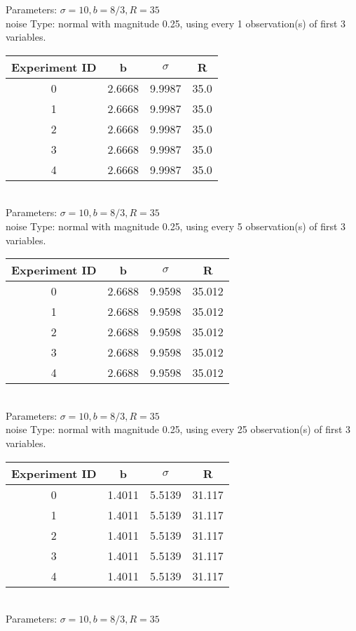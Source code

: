 \begin{multicols}{3}
Parameters: $\sigma=10, b=8/3, R=35$\\
noise Type: normal with magnitude 0.25, using every 1 observation(s) of first 3 variables.\\
\begin{tabular}{cccc}
\hline Experiment ID & b & $\sigma$ & R \\ \hline 
0 & 2.6668 & 9.9987 & 35.0\\ \hline 
 1 & 2.6668 & 9.9987 & 35.0\\ \hline 
 2 & 2.6668 & 9.9987 & 35.0\\ \hline 
 3 & 2.6668 & 9.9987 & 35.0\\ \hline 
 4 & 2.6668 & 9.9987 & 35.0\\ \hline 
 \end{tabular}\\
Parameters: $\sigma=10, b=8/3, R=35$\\
noise Type: normal with magnitude 0.25, using every 5 observation(s) of first 3 variables.\\
\begin{tabular}{cccc}
\hline Experiment ID & b & $\sigma$ & R \\ \hline 
0 & 2.6688 & 9.9598 & 35.012\\ \hline 
 1 & 2.6688 & 9.9598 & 35.012\\ \hline 
 2 & 2.6688 & 9.9598 & 35.012\\ \hline 
 3 & 2.6688 & 9.9598 & 35.012\\ \hline 
 4 & 2.6688 & 9.9598 & 35.012\\ \hline 
 \end{tabular}\\
Parameters: $\sigma=10, b=8/3, R=35$\\
noise Type: normal with magnitude 0.25, using every 25 observation(s) of first 3 variables.\\
\begin{tabular}{cccc}
\hline Experiment ID & b & $\sigma$ & R \\ \hline 
0 & 1.4011 & 5.5139 & 31.117\\ \hline 
 1 & 1.4011 & 5.5139 & 31.117\\ \hline 
 2 & 1.4011 & 5.5139 & 31.117\\ \hline 
 3 & 1.4011 & 5.5139 & 31.117\\ \hline 
 4 & 1.4011 & 5.5139 & 31.117\\ \hline 
 \end{tabular}\\
Parameters: $\sigma=10, b=8/3, R=35$\\

\end{multicols}
